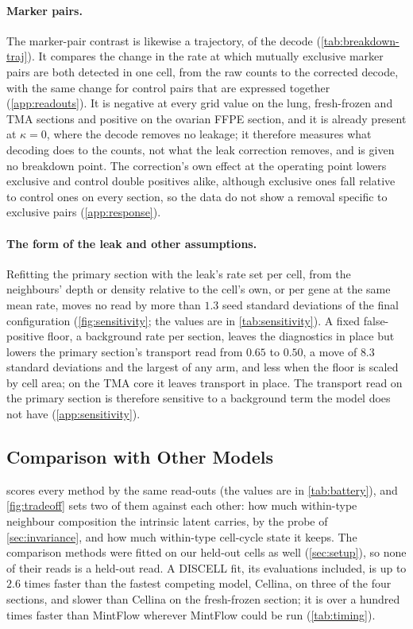 \paragraph{Marker pairs.}
The marker-pair contrast is likewise a trajectory, of the decode (\cref{tab:breakdown-traj}). It compares the change in the rate at which mutually exclusive marker pairs are both detected in one cell, from the raw counts to the corrected decode, with the same change for control pairs that are expressed together (\cref{app:readouts}). It is negative at every grid value on the lung, fresh-frozen and TMA sections and positive on the ovarian FFPE section, and it is already present at $\kappa = 0$, where the decode removes no leakage; it therefore measures what decoding does to the counts, not what the leak correction removes, and is given no breakdown point. The correction's own effect at the operating point lowers exclusive and control double positives alike, although exclusive ones fall relative to control ones on every section, so the data do not show a removal specific to exclusive pairs (\cref{app:response}).

\paragraph{The form of the leak and other assumptions.}
Refitting the primary section with the leak's rate set per cell, from the neighbours' depth or density relative to the cell's own, or per gene at the same mean rate, moves no read by more than $1.3$ seed standard deviations of the final configuration (\cref{fig:sensitivity}; the values are in \cref{tab:sensitivity}). A fixed false-positive floor, a background rate per section, leaves the diagnostics in place but lowers the primary section's transport read from $0.65$ to $0.50$, a move of $8.3$ standard deviations and the largest of any arm, and less when the floor is scaled by cell area; on the TMA core it leaves transport in place. The transport read on the primary section is therefore sensitive to a background term the model does not have (\cref{app:sensitivity}).

\subsection{Comparison with Other Models}
\label{sec:results-baselines}

 scores every method by the same read-outs (the values are in \cref{tab:battery}), and \cref{fig:tradeoff} sets two of them against each other: how much within-type neighbour composition the intrinsic latent carries, by the probe of \cref{sec:invariance}, and how much within-type cell-cycle state it keeps. The comparison methods were fitted on our held-out cells as well (\cref{sec:setup}), so none of their reads is a held-out read. A DISCELL fit, its evaluations included, is up to $2.6$ times faster than the fastest competing model, Cellina, on three of the four sections, and slower than Cellina on the fresh-frozen section; it is over a hundred times faster than MintFlow wherever MintFlow could be run (\cref{tab:timing}).

